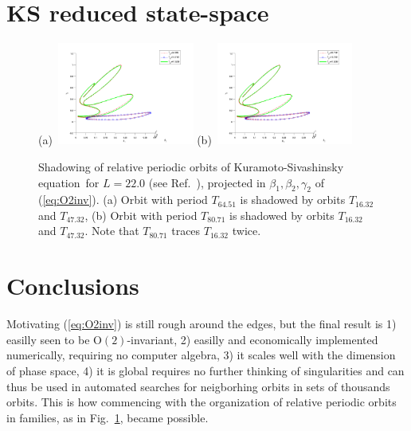 \documentclass[aip,cha,showpacs,twocolumn, 
 		  reprint]{revtex4-1} %
\newcommand{\refref} [1] {Ref.~\cite{#1}}
\newcommand{\refeq}  [1] {(\ref{#1})}
\newcommand{\reffig} [1] {Fig.~\ref{#1}}
\newcommand{\KSe}{Kuramoto-Siva\-shin\-sky equation}
\newcommand{\On}[1]{\ensuremath{\textrm{O}(#1)}}
\begin{document}
\section{KS reduced state-space} 

\begin{figure}
 (a)~\includegraphics[width=0.40\textwidth]{../figs/ks22rpo_shad1}
 (b)~\includegraphics[width=0.40\textwidth]{../figs/ks22rpo_shad2}
\caption{
 Shadowing of relative periodic orbits of \KSe\ for $L=22.0$ (see \refref{SCD07}), 
projected in $\beta_1, \beta_2, \gamma_2$ of 
\refeq{eq:O2inv}. (a) Orbit with period $T_{64.51}$ is shadowed by
orbits $T_{16.32}$ and $T_{47.32}$, (b) Orbit with period 
$T_{80.71}$ is shadowed by orbits $T_{16.32}$ and $T_{47.32}$. Note
that $T_{80.71}$ traces $T_{16.32}$ twice.
}
\label{fig:rpo_shad}
\end{figure}


\section{Conclusions}

Motivating \refeq{eq:O2inv} is still rough around the edges, but the final result is
1) easilly seen to be $\On{2}$-invariant, 2) easilly and economically 
implemented numerically, requiring no computer algebra, 3) it scales well
with the dimension of phase space, 4) it is global requires no further
thinking of singularities and can thus be used in automated searches for
neigborhing orbits in sets of thousands orbits. This is how commencing with the 
organization of relative periodic orbits in families, as in \reffig{fig:rpo_shad},
became possible.


\end{document}
